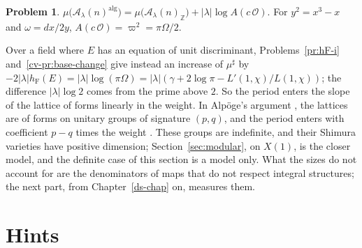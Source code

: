 \documentclass[reqno]{amsart}
\newcounter{chap}
\theoremstyle{definition}
\newtheorem{problem}{Problem}[section]
\theoremstyle{plain}
\newcommand{\Z}{\mathbb{Z}}
\newcommand{\Oc}{\mathcal{O}}
\newcommand{\Ac}{\mathcal{A}}
\newcommand{\hF}{h_{\mathrm{F}}}
\begin{document}
\begin{problem}\label{pr:dR-shift}
\(\mu\bigl(\Ac_\lambda(n)^{\mathrm{alg}}\bigr) = \mu\bigl(\Ac_\lambda(n)_\Z\bigr) + \lvert\lambda\rvert\log A(c\,\Oc)\).  For \(y^2 = x^3 - x\) and \(\omega = dx/2y\), \(A(c\,\Oc) = \varpi^2 = \pi\Omega/2\).
\end{problem}

Over a field where \(E\) has an equation of unit discriminant, Problems~\ref{pr:hF-i} and~\ref{cv-pr:base-change} give instead an increase of \(\mu^\sharp\) by \(-2\lvert\lambda\rvert\hF(E) = \lvert\lambda\rvert\log(\pi\Omega) = \lvert\lambda\rvert(\gamma + 2\log\pi - L'(1,\chi)/L(1,\chi))\); the difference \(\lvert\lambda\rvert\log 2\) comes from the prime above \(2\).  So the period enters the slope of the lattice of forms linearly in the weight.  In Alpöge's argument \cite{Alp}, \cite{Zh} the lattices are of forms on unitary groups of signature \((p,q)\), and the period enters with coefficient \(p - q\) times the weight \cite[Hyp.~15.58]{Adr}.  These groups are indefinite, and their Shimura varieties have positive dimension; Section~\ref{sec:modular}, on \(X(1)\), is the closer model, and the definite case of this section is a model only.  What the sizes do not account for are the denominators of maps that do not respect integral structures; the next part, from Chapter~\ref{ds-chap} on, measures them.

\section*{Hints}
\end{document}
